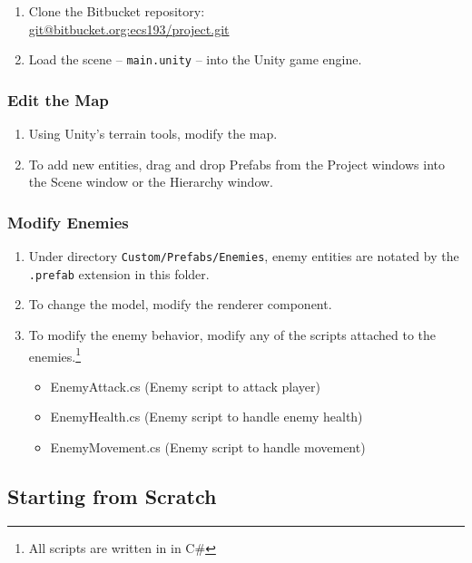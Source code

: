 \documentclass[a4paper]{refart}
\begin{document}
\begin{enumerate}
	\item Clone the Bitbucket repository:\\ \url{git@bitbucket.org:ecs193/project.git}
	\item Load the scene -- \texttt{main.unity} -- into the Unity game engine.
\end{enumerate}

\subsubsection{Edit the Map}

\begin{enumerate}
	\item Using Unity's terrain tools, modify the map.
	\item To add new entities, drag and drop Prefabs from the Project windows into the Scene window or the Hierarchy window.
\end{enumerate}

\subsubsection{Modify Enemies}

\begin{enumerate}
	\item Under directory \texttt{Custom/Prefabs/Enemies}, enemy entities are notated by the \texttt{.prefab} extension in this folder.
	\item To change the model, modify the renderer component.
	\item To modify the enemy behavior, modify any of the scripts attached to the enemies.\footnote{All scripts are written in in C\#}
	\begin{itemize}
		\item EnemyAttack.cs (Enemy script to attack player)
		\item EnemyHealth.cs (Enemy script to handle enemy health)
		\item EnemyMovement.cs (Enemy script to handle movement)
	\end{itemize}
\end{enumerate}

\subsection{Starting from Scratch}
\end{document}
